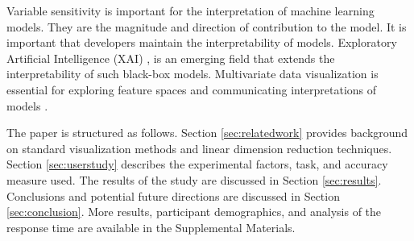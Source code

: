\documentclass[review,journal]{vgtc}         %
\begin{document}
Variable sensitivity is important for the interpretation of machine learning models. They are the magnitude and direction of contribution to the model. It is important that developers maintain the interpretability of models. Exploratory Artificial Intelligence (XAI) \cite{adadi_peeking_2018, arrieta_explainable_2020}, is an emerging field that extends the interpretability of such black-box models. Multivariate data visualization is essential for exploring feature spaces and communicating interpretations of models \cite{biecek_dalex_2018, biecek_explanatory_2021, wickham_visualizing_2015}.

The paper is structured as follows. Section \autoref{sec:relatedwork} provides background on standard visualization methods and linear dimension reduction techniques. Section \autoref{sec:userstudy} describes the experimental factors, task, and accuracy measure used. The results of the study are discussed in Section \autoref{sec:results}. Conclusions and potential future directions are discussed in Section \autoref{sec:conclusion}. More results, participant demographics, and analysis of the response time are available in the Supplemental Materials.




%

%
%
%


\end{document}
